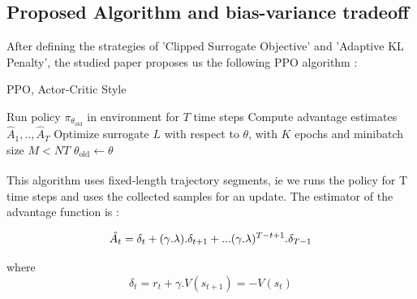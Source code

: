 \documentclass{article}
\begin{document}
\subsection{Proposed Algorithm and bias-variance tradeoff} \label{"4.3"}

After defining the strategies of 'Clipped Surrogate Objective' and 'Adaptive KL Penalty', the studied paper proposes us the following PPO algorithm : 
\begin{algorithm}[h]
\caption{PPO, Actor-Critic Style}\label{alg:VPG}
\begin{algorithmic}[1]
\State Run policy $\pi_{\theta_\text{old}}$ in environment for $T$ time steps
\State Compute advantage estimates $\hat{A}_1, .., \hat{A}_T$
\EndFor
\State Optimize surrogate $L$ with respect to $\theta$, with $K$ epochs and minibatch size $M <  NT$
\State $\theta_{\text{old}}\xleftarrow[]{} \theta$
\EndFor
\end{algorithmic}
\end{algorithm}


This algorithm uses fixed-length trajectory segments, ie we runs the policy for T time steps and uses the collected samples for an update.  
The estimator of the advantage function is : 

$$\hat{A_t} = \delta_t + (\gamma .\lambda).\delta_{t+1} + ...(\gamma .\lambda)^{T-t+1}.\delta_{T-1} \\ $$

where $$\delta_t = r_t + \gamma .V(s_{t+1})= - V(s_t)$$
\end{document}

